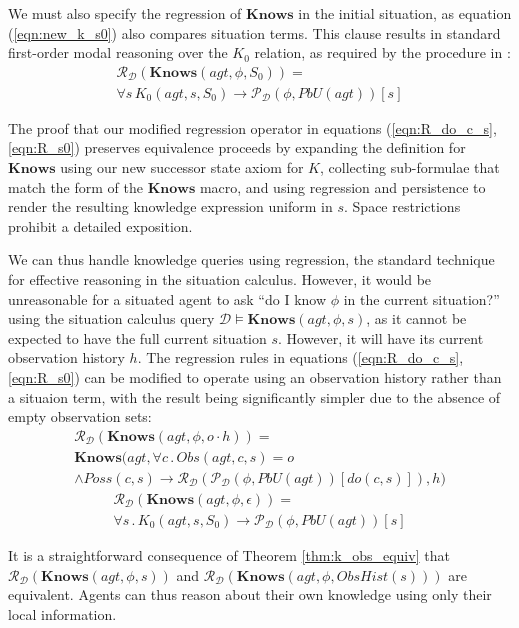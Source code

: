 \documentclass{ifaamas-submission}
\begin{document}
We must also specify the regression of $\mathbf{Knows}$ in the initial
situation, as equation (\ref{eqn:new_k_s0}) also compares situation terms.
This clause results in standard first-order modal reasoning
over the $K_{0}$ relation, as required by the procedure in \cite{scherl03sc_knowledge}:
\begin{multline}
\mathcal{R}_{\mathcal{D}}(\mathbf{Knows}(agt,\phi,S_{0}))=\\
\forall s\, K_{0}(agt,s,S_{0})\rightarrow\mathcal{P}_{\mathcal{D}}(\phi,PbU(agt))[s]\label{eqn:R_s0}
\end{multline}

The proof that our modified regression
operator in equations (\ref{eqn:R_do_c_s},\ref{eqn:R_s0}) preserves
equivalence proceeds by expanding the definition for $\mathbf{Knows}$
using our new successor state axiom for $K$, collecting sub-formulae
that match the form of the $\mathbf{Knows}$ macro, and using regression
and persistence to render the resulting knowledge expression uniform
in $s$.  Space restrictions prohibit a detailed exposition.

We can thus handle knowledge queries using regression, the standard
technique for effective reasoning in the situation calculus.
However, it would be unreasonable for a situated agent to ask {}``do
I know $\phi$ in the current situation?'' using the situation calculus
query $\mathcal{D}\models\mathbf{Knows}(agt,\phi,s)$, as it cannot
be expected to have the full current situation $s$. However, it will
have its current observation history $h$.
The regression rules in equations (\ref{eqn:R_do_c_s},\ref{eqn:R_s0})
can be modified to operate using an observation history rather than a
situaion term, with the result being significantly simpler due to the
absence of empty observation sets:
\begin{multline}
\mathcal{R}_{\mathcal{D}}(\mathbf{Knows}(agt,\phi,o\cdot h))=\\
\mathbf{Knows}(agt,\forall c\,.\, Obs(agt,c,s)=o\\
\wedge Poss(c,s)\rightarrow\mathcal{R}_{\mathcal{D}}(\mathcal{P}_{\mathcal{D}}(\phi,PbU(agt))[do(c,s)]),h)
\end{multline}
\begin{multline}
\mathcal{R}_{\mathcal{D}}(\mathbf{Knows}(agt,\phi,\epsilon))=\\
\forall s\,.\, K_{0}(agt,s,S_{0})\rightarrow\mathcal{P}_{\mathcal{D}}(\phi,PbU(agt))[s]
\end{multline}

It is a straightforward consequence of Theorem \ref{thm:k_obs_equiv}
that $\mathcal{R}_{\mathcal{D}}(\mathbf{Knows}(agt,\phi,s))$  and
$\mathcal{R}_{\mathcal{D}}(\mathbf{Knows}(agt,\phi,ObsHist(s)))$
are equivalent.
Agents can thus reason about their own knowledge
using only their local information.
\end{document}
